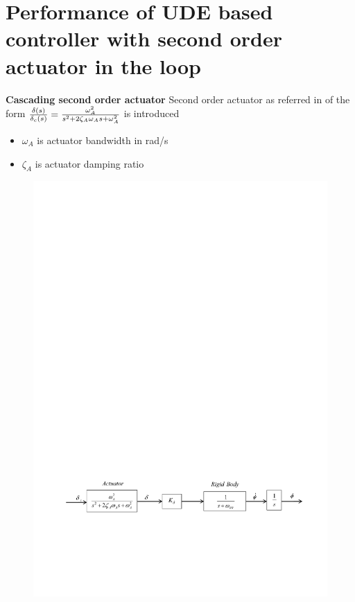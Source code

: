\documentclass[table,10pt,red]{beamer}	%
\begin{document}
\section{Performance of UDE based controller with second order actuator in the loop}
\begin{frame}
\textbf{Cascading second order actuator}
Second order actuator as referred in \cite{talole2011} of the form ${{\delta (s)}\over{\delta_c(s)}} = {{\omega^2_A}\over{s^2 + 2\zeta_A \omega_A s + \omega^2_A}}$ is introduced
\begin{itemize}  %
		\item $\omega_A$ is actuator bandwidth in rad/s 
		\item $\zeta_A$ is actuator damping ratio
\end{itemize}
\begin{figure}
	\includegraphics[width=0.8\linewidth]{fig4}
	\end{figure}
\end{frame}
\end{document}
